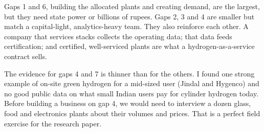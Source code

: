 \begin{finding}
Gaps 1 and 6, building the allocated plants and creating demand, are the largest, but they need state power or billions of rupees. Gaps 2, 3 and 4 are smaller but match a capital-light, analytics-heavy team. They also reinforce each other. A company that services stacks collects the operating data; that data feeds certification; and certified, well-serviced plants are what a hydrogen-as-a-service contract sells. \confM
\end{finding}

\begin{plainwords}
The evidence for gaps 4 and 7 is thinner than for the others. I found one strong example of on-site green hydrogen for a mid-sized user (Jindal and Hygenco) and no good public data on what small Indian users pay for cylinder hydrogen today. Before building a business on gap 4, we would need to interview a dozen glass, food and electronics plants about their volumes and prices. That is a perfect field exercise for the research paper.
\end{plainwords}
